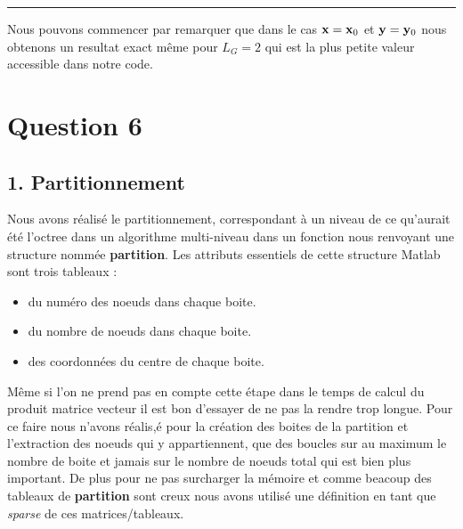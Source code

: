 \documentclass[10pt]{article}
\begin{document}
\hfill\rule{8cm}{1pt}

\begin{multicols}{2}

Nous pouvons commencer par remarquer que dans le cas ${\bf x}={\bf x}_0$ et ${\bf y}={\bf y}_0$ nous obtenons un resultat exact même pour $L_G=2$ qui est la plus petite valeur accessible dans notre code.  

\vspace*{22pt}


\section*{Question 6}

\subsection*{1. Partitionnement}

Nous avons réalisé le partitionnement, correspondant à un niveau de ce qu'aurait été l'octree dans un algorithme multi-niveau dans un fonction nous renvoyant une structure nommée \textbf{partition}. Les attributs essentiels de cette structure Matlab sont trois tableaux : \\

\begin{itemize}
\item du numéro des noeuds dans chaque boite. 
\item du nombre de noeuds dans chaque boite.
\item des coordonnées du centre de chaque boite. 
\end{itemize}

\vspace*{10pt}
Même si l'on ne prend pas en compte cette étape dans le temps de calcul du produit matrice vecteur il est bon d'essayer de ne pas la rendre trop longue. Pour ce faire nous n'avons réalis,é pour la création des boites de la partition et l'extraction des noeuds qui y appartiennent, que des boucles sur au maximum le nombre de boite et jamais sur le nombre de noeuds total qui est bien plus important. De plus pour ne pas surcharger la mémoire et comme beacoup des tableaux de \textbf{partition} sont creux nous avons utilisé une définition en tant que \textit{sparse} de ces matrices/tableaux. \\




\end{multicols}
\end{document}
